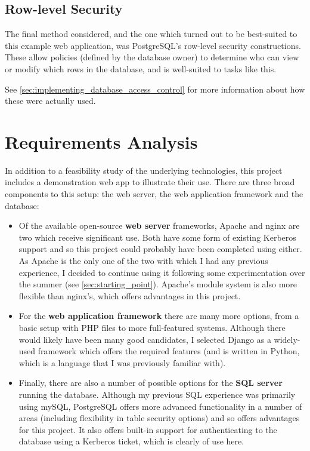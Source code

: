 \documentclass[12pt]{report}
\begin{document}
\subsection{Row-level Security}
The final method considered, and the one which turned out to be best-suited to this example web application, was PostgreSQL's row-level security constructions. These allow policies (defined by the database owner) to determine who can view or modify which rows in the database, and is well-suited to tasks like this.

See \autoref{sec:implementing_database_access_control} for more information about how these were actually used.

\section{Requirements Analysis}
In addition to a feasibility study of the underlying technologies, this project includes a demonstration web app to illustrate their use. There are three broad components to this setup: the web server, the web application framework and the database:

\begin{itemize}
\item
  Of the available open-source \textbf{web server} frameworks, Apache and nginx are two which receive significant use. Both have some form of existing Kerberos support and so this project could probably have been completed using either. As Apache is the only one of the two with which I had any previous experience, I decided to continue using it following some experimentation over the summer (see \autoref{sec:starting_point}). Apache's module system is also more flexible than nginx's, which offers advantages in this project.

\item
  For the \textbf{web application framework} there are many more options, from a basic setup with PHP files to more full-featured systems. Although there would likely have been many good candidates, I selected Django as a widely-used framework which offers the required features (and is written in Python, which is a language that I was previously familiar with).

\item
  Finally, there are also a number of possible options for the \textbf{SQL server} running the database. Although my previous SQL experience was primarily using mySQL, PostgreSQL offers more advanced functionality in a number of areas (including flexibility in table security options) and so offers advantages for this project. It also offers built-in support for authenticating to the database using a Kerberos ticket, which is clearly of use here.
\end{itemize}
\end{document}
